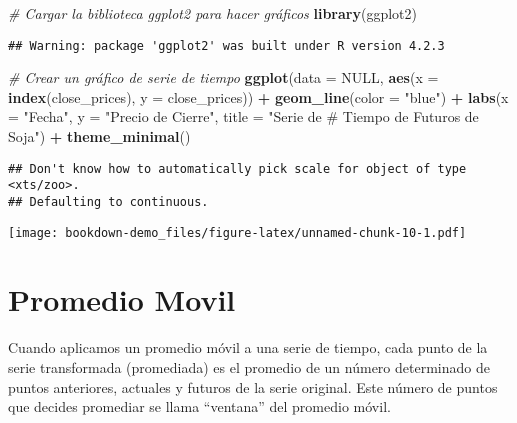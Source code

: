 \documentclass[
]{book}
\newenvironment{Shaded}{\begin{snugshade}}{\end{snugshade}}
\newcommand{\AttributeTok}[1]{\textcolor[rgb]{0.13,0.29,0.53}{#1}}
\newcommand{\CommentTok}[1]{\textcolor[rgb]{0.56,0.35,0.01}{\textit{#1}}}
\newcommand{\ConstantTok}[1]{\textcolor[rgb]{0.56,0.35,0.01}{#1}}
\newcommand{\FunctionTok}[1]{\textcolor[rgb]{0.13,0.29,0.53}{\textbf{#1}}}
\newcommand{\NormalTok}[1]{#1}
\newcommand{\SpecialCharTok}[1]{\textcolor[rgb]{0.81,0.36,0.00}{\textbf{#1}}}
\newcommand{\StringTok}[1]{\textcolor[rgb]{0.31,0.60,0.02}{#1}}
\begin{document}
\begin{Shaded}
\begin{Highlighting}[]
\CommentTok{\# Cargar la biblioteca ggplot2 para hacer gráficos}
\FunctionTok{library}\NormalTok{(ggplot2)}
\end{Highlighting}
\end{Shaded}

\begin{verbatim}
## Warning: package 'ggplot2' was built under R version 4.2.3
\end{verbatim}

\begin{Shaded}
\begin{Highlighting}[]
\CommentTok{\# Crear un gráfico de serie de tiempo}
\FunctionTok{ggplot}\NormalTok{(}\AttributeTok{data =} \ConstantTok{NULL}\NormalTok{, }\FunctionTok{aes}\NormalTok{(}\AttributeTok{x =} \FunctionTok{index}\NormalTok{(close\_prices), }\AttributeTok{y =}\NormalTok{ close\_prices)) }\SpecialCharTok{+}
  \FunctionTok{geom\_line}\NormalTok{(}\AttributeTok{color =} \StringTok{"blue"}\NormalTok{) }\SpecialCharTok{+}
  \FunctionTok{labs}\NormalTok{(}\AttributeTok{x =} \StringTok{"Fecha"}\NormalTok{, }\AttributeTok{y =} \StringTok{"Precio de Cierre"}\NormalTok{, }\AttributeTok{title =} \StringTok{"Serie de }
\StringTok{\# Tiempo de Futuros de Soja"}\NormalTok{) }\SpecialCharTok{+}
  \FunctionTok{theme\_minimal}\NormalTok{()}
\end{Highlighting}
\end{Shaded}

\begin{verbatim}
## Don't know how to automatically pick scale for object of type <xts/zoo>.
## Defaulting to continuous.
\end{verbatim}

\texttt{[image: bookdown-demo\_files/figure-latex/unnamed-chunk-10-1.pdf]}

\hypertarget{promedio-movil}{%
\chapter{Promedio Movil}\label{promedio-movil}}

Cuando aplicamos un promedio móvil a una serie de tiempo, cada punto de la serie transformada (promediada) es el promedio de un número determinado de puntos anteriores, actuales y futuros de la serie original. Este número de puntos que decides promediar se llama ``ventana'' del promedio móvil.
\end{document}

